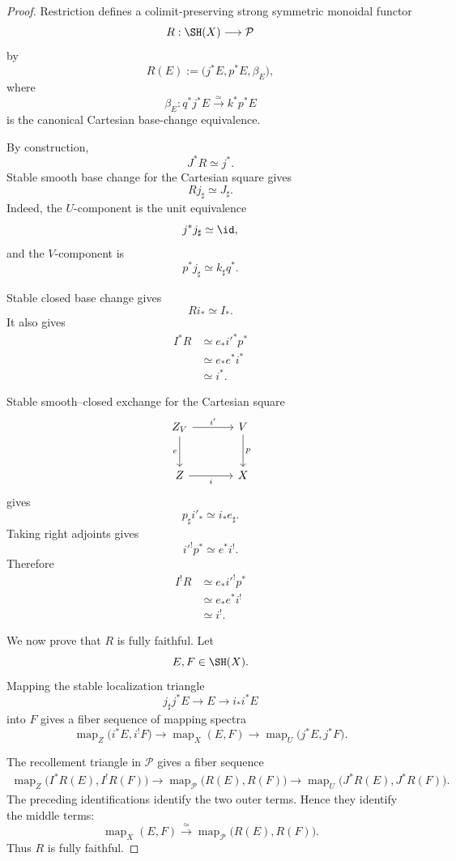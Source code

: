 \begin{proof}
Restriction defines a colimit-preserving strong symmetric monoidal functor
\[
    R:
    \SH(X)
    \longrightarrow
    \mathcal P
\]
by
\[
    R(E)
    :=
    \bigl(
      j^*E,
      p^*E,
      \beta_E
    \bigr),
\]
where
\[
    \beta_E:
    q^*j^*E
    \xrightarrow{\simeq}
    k^*p^*E
\]
is the canonical Cartesian base-change equivalence.

By construction,
\[
    J^*R
    \simeq
    j^*.
\]
Stable smooth base change for the Cartesian square gives
\[
    Rj_\sharp
    \simeq
    J_\sharp.
\]
Indeed, the \(U\)-component is the unit equivalence
\[
    j^*j_\sharp\simeq\id,
\]
and the \(V\)-component is
\[
    p^*j_\sharp
    \simeq
    k_\sharp q^*.
\]

Stable closed base change gives
\[
    Ri_*
    \simeq
    I_*.
\]
It also gives
\[
\begin{aligned}
    I^*R
    &\simeq
    e_*i'^*p^* \\
    &\simeq
    e_*e^*i^* \\
    &\simeq
    i^*.
\end{aligned}
\]

Stable smooth--closed exchange for the Cartesian square
\[
\begin{tikzcd}[column sep=large,row sep=large]
    Z_V \arrow[r,"i'"] \arrow[d,"e"']
        & V \arrow[d,"p"] \\
    Z \arrow[r,"i"']
        & X
\end{tikzcd}
\]
gives
\[
    p_\sharp i'_*
    \simeq
    i_*e_\sharp.
\]
Taking right adjoints gives
\[
    i'^!p^*
    \simeq
    e^*i^!.
\]
Therefore
\[
\begin{aligned}
    I^!R
    &\simeq
    e_*i'^!p^* \\
    &\simeq
    e_*e^*i^! \\
    &\simeq
    i^!.
\end{aligned}
\]

We now prove that \(R\) is fully faithful.  Let
\[
    E,F\in\SH(X).
\]
Mapping the stable localization triangle
\[
    j_\sharp j^*E
    \longrightarrow
    E
    \longrightarrow
    i_*i^*E
\]
into \(F\) gives a fiber sequence of mapping spectra
\[
    \operatorname{map}_Z
    \bigl(
      i^*E,
      i^!F
    \bigr)
    \longrightarrow
    \operatorname{map}_X(E,F)
    \longrightarrow
    \operatorname{map}_U
    \bigl(
      j^*E,
      j^*F
    \bigr).
\]

The recollement triangle in \(\mathcal P\) gives a fiber sequence
\[
\begin{aligned}
    \operatorname{map}_Z
    \bigl(
      I^*R(E),
      I^!R(F)
    \bigr)
    \longrightarrow
    \operatorname{map}_{\mathcal P}
    \bigl(
      R(E),
      R(F)
    \bigr)
    \longrightarrow
    \operatorname{map}_U
    \bigl(
      J^*R(E),
      J^*R(F)
    \bigr).
\end{aligned}
\]
The preceding identifications identify the two outer terms.  Hence they
identify the middle terms:
\[
    \operatorname{map}_X(E,F)
    \xrightarrow{\simeq}
    \operatorname{map}_{\mathcal P}
    \bigl(
      R(E),
      R(F)
    \bigr).
\]
Thus \(R\) is fully faithful.


\end{proof}
